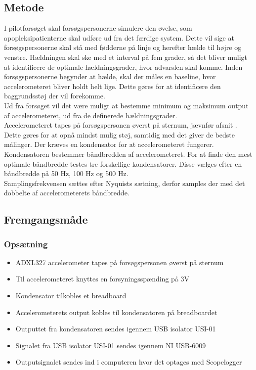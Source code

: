 \subsection{Metode}
I pilotforsøget skal forsøgspersonerne simulere den øvelse, som apopleksipatienterne skal udføre ud fra det færdige system. Dette vil sige at forsøgspersonerne skal stå med fødderne på linje og herefter hælde til højre og venstre. Hældningen skal ske med et interval på fem grader, så det bliver muligt at identificere de optimale hældningsgrader, hvor advarslen skal komme. Inden forsøgspersonerne begynder at hælde, skal der måles en baseline, hvor accelerometeret bliver holdt helt lige. Dette gøres for at identificere den baggrundsstøj der vil forekomme. \\
Ud fra forsøget vil det være muligt at bestemme minimum og maksimum output af accelerometeret, ud fra de definerede hældningsgrader. \\
Accelerometeret tapes på forsøgspersonen øverst på sternum, jævnfør afsnit . Dette gøres for at opnå mindst mulig støj, samtidig med det giver de bedste målinger. Der kræves en kondensator for at accelerometeret fungerer. Kondensatoren bestemmer båndbredden af accelerometeret. For at finde den mest optimale båndbredde testes tre forskellige kondensatorer. Disse vælges efter en båndbredde på 50 Hz, 100 Hz og 500 Hz. \\
Samplingsfrekvensen sættes efter Nyquists sætning, derfor samples der med det dobbelte af accelerometerets båndbredde.


\subsection{Fremgangsmåde}
\subsubsection{Opsætning}
\begin{itemize}
\item ADXL327 accelerometer tapes på forsøgspersonen øverst på sternum
\item Til accelerometeret knyttes en forsyningsspænding på 3V 
\item Kondensator tilkobles et breadboard
\item Accelerometerets output kobles til kondensatoren på breadboardet
\item Outputtet fra kondensatoren sendes igennem USB isolator USI-01 
\item Signalet fra USB isolator USI-01 sendes igennem NI USB-6009
\item Outputsignalet sendes ind i computeren hvor det optages med Scopelogger
\end{itemize}

